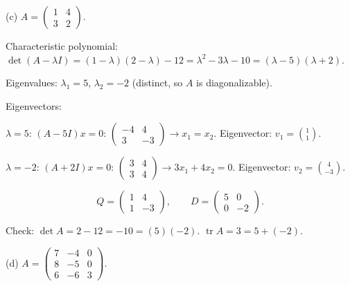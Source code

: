 \documentclass{article}
\begin{document}
\bigskip

\noindent\textnormal{(c)}
$A = \begin{pmatrix} 1 & 4 \\ 3 & 2 \end{pmatrix}$.

\begin{mdframed}[linewidth=1pt]
\textnormal{Characteristic polynomial:}
$\det(A - \lambda I) = (1-\lambda)(2-\lambda) - 12 = \lambda^2 - 3\lambda - 10 = (\lambda - 5)(\lambda + 2)$.

Eigenvalues: $\lambda_1 = 5$, $\lambda_2 = -2$ (distinct, so $A$ is \textnormal{diagonalizable}).

\textnormal{Eigenvectors:}

$\lambda = 5$: $(A - 5I)x = 0$: $\begin{pmatrix} -4 & 4 \\ 3 & -3 \end{pmatrix} \to x_1 = x_2$. Eigenvector: $v_1 = \binom{1}{1}$.

$\lambda = -2$: $(A + 2I)x = 0$: $\begin{pmatrix} 3 & 4 \\ 3 & 4 \end{pmatrix} \to 3x_1 + 4x_2 = 0$. Eigenvector: $v_2 = \binom{4}{-3}$.

\[
\boxed{Q = \begin{pmatrix} 1 & 4 \\ 1 & -3 \end{pmatrix}, \qquad D = \begin{pmatrix} 5 & 0 \\ 0 & -2 \end{pmatrix}.}
\]

\textnormal{Check:} $\det A = 2 - 12 = -10 = (5)(-2)$. $\operatorname{tr} A = 3 = 5 + (-2)$.\end{mdframed}

\bigskip

\noindent\textnormal{(d)}
$A = \begin{pmatrix} 7 & -4 & 0 \\ 8 & -5 & 0 \\ 6 & -6 & 3 \end{pmatrix}$.
\end{document}
